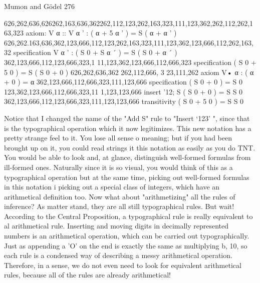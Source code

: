 Mumon and Gödel                                                                      276

626,262,636,626262,163,636,362262,112,123,262,163,323,111,123,362,262,112,262,163,323 axiom:
 V α :: V α ' : ( α + 5 α ' ) = S ( α + α ' )
626,262.163,636,362,123,666,112,123,262,163,323,111,123,362,123,666,112,262,163,32 specification
 V α ' : ( S 0 + S α ´ ) = S (                                 S 0 + α ´ )
362,123,666,112,123,666,323,1 11,123,362,123,666,112,666,323                     specification
 (   S 0 + 5          0 ) = S (           S 0      + 0     )
626,262,636,362 262,112,666, 3 23,111,262                                        axiom
 V• α : ( α + 0 ) = α
362,123,666,112,666,323,111,123,666                                              specification
  ( S 0 + 0           ) =     S 0
123,362,123,666,112,666,323,11 1,123,123,666                                     insert '12;
 S    ( S 0 + 0           ) =      S S 0
362,123,666,112,123,666,323,111,123,123,666                                      transitivity
  ( S 0 + 5 0            ) =       S S 0

Notice that I changed the name of the "Add S" rule to "Insert `123' ", since that is the
typographical operation which it now legitimizes.
        This new notation has a pretty strange feel to it. You lose all sense o meaning; but
if you had been brought up on it, you could read strings it this notation as easily as you do
TNT. You would be able to look and, at glance, distinguish well-formed formulas from
ill-formed ones. Naturally since it is so visual, you would think of this as a typographical
operation but at the same time, picking out well-formed formulas in this notation i
picking out a special class of integers, which have an arithmetical definition too.
        Now what about "arithmetizing" all the rules of inference? As matter stand, they
are all still typographical rules. But wait! According to the Central Proposition, a
typographical rule is really equivalent to al arithmetical rule. Inserting and moving digits
in decimally represented numbers is an arithmetical operation, which can be carried out
typographically. Just as appending a 'O' on the end is exactly the same as multiplying b,
10, so each rule is a condensed way of describing a messy arithmetical operation.
Therefore, in a sense, we do not even need to look for equivalent arithmetical rules,
because all of the rules are already arithmetical!


